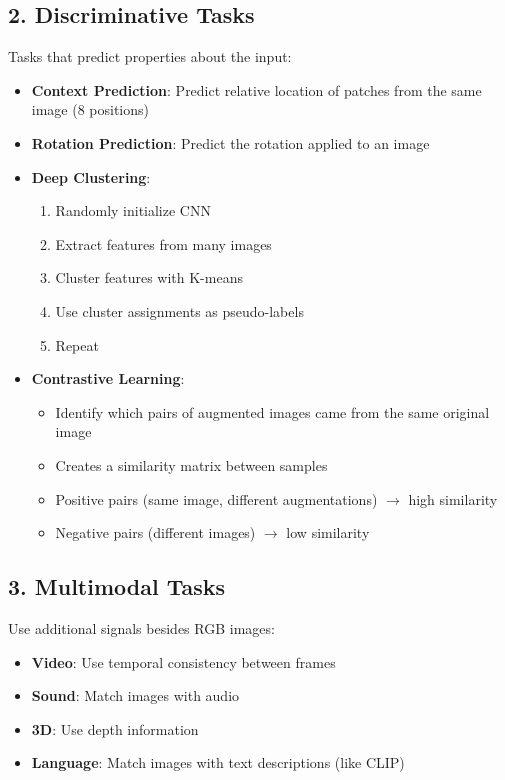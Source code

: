 \subsection*{2. Discriminative Tasks}
Tasks that predict properties about the input:
\begin{itemize}
    \item \textbf{Context Prediction}: Predict relative location of patches from the same image (8 positions)
    \item \textbf{Rotation Prediction}: Predict the rotation applied to an image
    \item \textbf{Deep Clustering}:
    \begin{enumerate}
        \item Randomly initialize CNN
        \item Extract features from many images
        \item Cluster features with K-means
        \item Use cluster assignments as pseudo-labels
        \item Repeat
    \end{enumerate}
    \item \textbf{Contrastive Learning}:
    \begin{itemize}
        \item Identify which pairs of augmented images came from the same original image
        \item Creates a similarity matrix between samples
        \item Positive pairs (same image, different augmentations) $\rightarrow$ high similarity
        \item Negative pairs (different images) $\rightarrow$ low similarity
    \end{itemize}
\end{itemize}

\subsection*{3. Multimodal Tasks}
Use additional signals besides RGB images:
\begin{itemize}
    \item \textbf{Video}: Use temporal consistency between frames
    \item \textbf{Sound}: Match images with audio
    \item \textbf{3D}: Use depth information
    \item \textbf{Language}: Match images with text descriptions (like CLIP)
\end{itemize}
